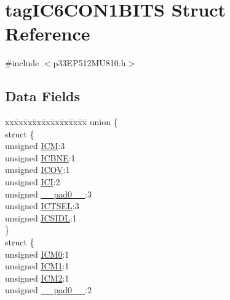\hypertarget{structtag_i_c6_c_o_n1_b_i_t_s}{}\section{tag\+I\+C6\+C\+O\+N1\+B\+I\+TS Struct Reference}
\label{structtag_i_c6_c_o_n1_b_i_t_s}


{\ttfamily \#include $<$p33\+E\+P512\+M\+U810.\+h$>$}

\subsection*{Data Fields}
\begin{DoxyCompactItemize}
\item 
\begin{tabbing}
xx\=xx\=xx\=xx\=xx\=xx\=xx\=xx\=xx\=\kill
union \{\\
\>struct \{\\
\>\>unsigned \hyperlink{structtag_i_c6_c_o_n1_b_i_t_s_ad3edde44ecb2d349ffa2decd0a251c20}{ICM}:3\\
\>\>unsigned \hyperlink{structtag_i_c6_c_o_n1_b_i_t_s_a824e7dcca83939e1b049d63ffcee33e9}{ICBNE}:1\\
\>\>unsigned \hyperlink{structtag_i_c6_c_o_n1_b_i_t_s_a49392949376ba0bf58cf8db889e86c94}{ICOV}:1\\
\>\>unsigned \hyperlink{structtag_i_c6_c_o_n1_b_i_t_s_a72486dcb868aad2d5c978494691356cc}{ICI}:2\\
\>\>unsigned \hyperlink{structtag_i_c6_c_o_n1_b_i_t_s_adf71f3d8410c1f1dbbc96680a92c49af}{\_\_pad0\_\_}:3\\
\>\>unsigned \hyperlink{structtag_i_c6_c_o_n1_b_i_t_s_a7a9dd41b5f93eb620df7fa336e452677}{ICTSEL}:3\\
\>\>unsigned \hyperlink{structtag_i_c6_c_o_n1_b_i_t_s_af441b36127c0bb7a35162dfc9a64103c}{ICSIDL}:1\\
\>\} \\
\>struct \{\\
\>\>unsigned \hyperlink{structtag_i_c6_c_o_n1_b_i_t_s_a649b1dd9bca75e558f37a9f52a829bd4}{ICM0}:1\\
\>\>unsigned \hyperlink{structtag_i_c6_c_o_n1_b_i_t_s_af3fe77ef9f8ca41ff11519f445e7bc77}{ICM1}:1\\
\>\>unsigned \hyperlink{structtag_i_c6_c_o_n1_b_i_t_s_a3c62c9cbbc3a406402126c932b709db8}{ICM2}:1\\
\>\>unsigned \hyperlink{structtag_i_c6_c_o_n1_b_i_t_s_adf71f3d8410c1f1dbbc96680a92c49af}{\_\_pad0\_\_}:2\\

\end{tabbing}
\end{DoxyCompactItemize}
